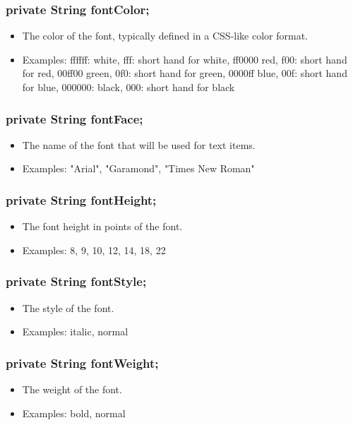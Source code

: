 \documentclass[letterpaper,10pt]{article}
\begin{document}
\subsubsection{private String fontColor;}
\begin{itemize}
 \item The color of the font, typically defined in a CSS-like color format.
 \item Examples: ffffff: white, fff: short hand for white, ff0000 red, f00:
 short hand for red, 00ff00 green, 0f0: short hand for green, 0000ff
 blue, 00f: short hand for blue, 000000: black, 000: short hand for
 black
\end{itemize}

\subsubsection{private String fontFace;}
\begin{itemize}
 \item The name of the font that will be used for text items.
 \item Examples: "Arial", "Garamond", "Times New Roman"
\end{itemize}

\subsubsection{private String fontHeight;}
\begin{itemize}
 \item The font height in points of the font.
 \item Examples: 8, 9, 10, 12, 14, 18, 22
\end{itemize}

\subsubsection{private String fontStyle;}
\begin{itemize}
 \item The style of the font.
 \item Examples: italic, normal
\end{itemize}

\subsubsection{private String fontWeight;}
\begin{itemize}
 \item The weight of the font.
 \item Examples: bold, normal
\end{itemize}
\end{document}
